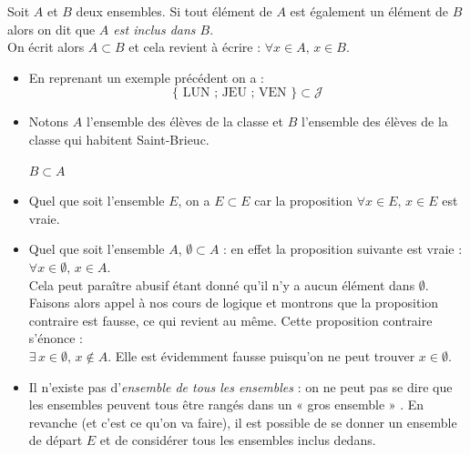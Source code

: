 \begin{definition}[ : inclusion]
    Soit $A$ et $B$ deux ensembles. Si tout élément de $A$ est également un élément de $B$ alors on dit que \textit{$A$ est inclus dans $B$}.\\
    On écrit alors $A\subset B$ et cela revient à écrire : $\forall x\in A,\,x\in B$.
\end{definition}

\begin{exemple}[s]
    \begin{itemize}
        \item 	En reprenant un exemple précédent on a :
              $$\lbrace \text{ LUN ; JEU ; VEN }\rbrace \subset \mathcal{J}$$
        \item 	Notons $A$ l'ensemble des élèves de la classe et $B$ l'ensemble des élèves de la classe qui habitent Saint-Brieuc.\\
              \begin{center}

                  $B\subset A$
              \end{center}
    \end{itemize}
\end{exemple}
\begin{remarque}[s]
    \begin{itemize}
        \item Quel que soit l'ensemble $E$, on a $E\subset E$ car la proposition $\forall x\in E,\,x\in E$ est vraie.
        \item 	Quel que soit l'ensemble $A$, $\emptyset \subset A$ : en effet la proposition suivante est vraie : $\forall x\in\emptyset,\,x\in A$.\\
              Cela peut paraître abusif étant donné qu'il n'y a aucun élément dans $\emptyset$. Faisons alors appel à nos cours de logique et montrons que la proposition contraire est fausse, ce qui revient au même. Cette proposition contraire s'énonce :\\
              $\exists\, x\in\emptyset,\,x\notin A$. Elle est évidemment fausse puisqu'on ne peut trouver $x\in\emptyset$.
        \item 	Il n'existe pas d'\textit{ensemble de tous les ensembles} : on ne peut pas se dire que les ensembles peuvent tous être rangés dans un « gros ensemble » . En revanche (et c'est ce qu'on va faire), il est possible de se donner un ensemble de départ $E$ et de considérer tous les ensembles inclus dedans.
    \end{itemize}
\end{remarque}

